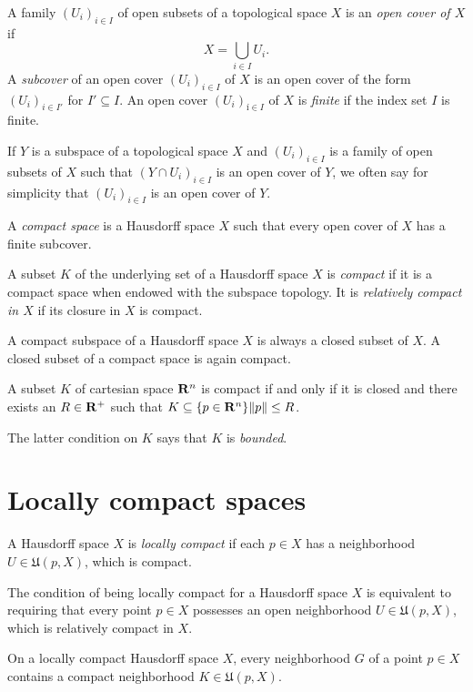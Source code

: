 A family $(U_i)_{i \in I}$ of open subsets of a topological space $X$ is an
\emph{open cover of $X$} if
\[
  X = \bigcup_{i \in I} U_i.
\]
A \emph{subcover} of an open cover $(U_i)_{i \in I}$ of $X$
is an open cover of the form $(U_i)_{i \in I'}$ for $I' \subseteq I$. An open
cover $(U_i)_{í \in I}$ of $X$ is \emph{finite} if the index set $I$ is finite.

If $Y$ is a subspace of a topological space $X$ and $(U_i)_{i \in I}$ is a family
of open subsets of $X$ such that $(Y \cap U_i)_{i \in I}$ is an open cover of
$Y$, we often say for simplicity that $(U_i)_{i \in I}$ is an open cover of $Y$.

\begin{dfn}
  A \emph{compact space} is a Hausdorff space $X$ such that every open cover of
  $X$ has a finite subcover.
\end{dfn}

A subset $K$ of the underlying set of a Hausdorff space $X$ is \emph{compact}
if it is a compact space when endowed with the subspace topology. It is \emph{relatively
compact in $X$} if its closure in $X$ is compact.

A compact subspace of a Hausdorff space $X$ is always a closed subset of $X$. A closed
subset of a compact space is again compact.

\begin{thm}
  A subset $K$ of cartesian space $\mathbf{R}^n$ is compact if and only if it is closed
  and there exists an $R \in \mathbf{R}^+$ such that $K \subseteq \lbrace p \in \mathbf{R}^n\rbrace{\lVert p\rVert \leq R}$.
\end{thm}

The latter condition on $K$ says that $K$ is \emph{bounded}.

\section{Locally compact spaces}
\label{sec:locally_compact}

\begin{dfn}
  A Hausdorff space $X$ is \emph{locally compact} if each $p \in X$ has a
  neighborhood $U \in \mathfrak U(p, X)$, which is compact.
\end{dfn}
The condition of being locally compact for a Hausdorff space $X$ is equivalent to
requiring that every point $p \in X$ possesses an open neighborhood $U \in \mathfrak U(p, X)$,
which is relatively compact in $X$.

\begin{prop}
  \label{prop:locally_compact}
  On a locally compact Hausdorff space $X$, every neighborhood $G$ of a point $p \in X$
  contains a compact neighborhood $K \in \mathfrak U(p, X)$.
\end{prop}

